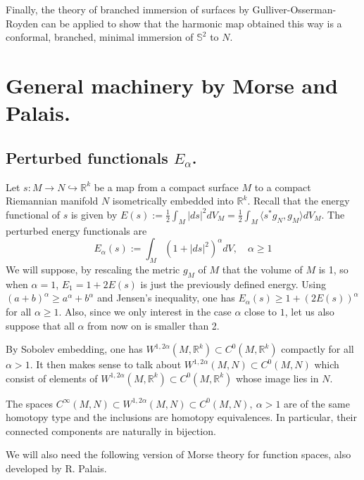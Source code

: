 Finally, the theory of branched immersion of surfaces by Gulliver-Osserman-Royden
\cite{gulliver_theory_1973} can be applied to show that the harmonic map obtained this way
is a conformal, branched, minimal immersion of \(\mathbb{S}^2\) to \(N\).

\section{General machinery by Morse and Palais.}
\label{sec:org803244d}

\subsection{Perturbed functionals \(E_\alpha\).}
\label{sec:orgd6188a2}

Let \(s: M \longrightarrow N \hookrightarrow \mathbb{R}^k\) be a map from a compact
surface \(M\) to a compact Riemannian manifold \(N\) isometrically embedded into \(\mathbb{R}^k\). Recall that the energy functional of \(s\) is given by \(E(s):=
\frac{1}{2}\int_M |ds|^2 dV_M = \frac{1}{2}\int_M \langle s^* g_N, g_M \rangle dV_M\). The perturbed energy functionals are
\[
 E_\alpha(s) := \int_M\left(1 + |ds|^2\right)^\alpha dV,\quad \alpha \geq 1
\]
We will suppose, by rescaling the metric \(g_M\) of \(M\) that the volume of \(M\)
is 1, so when \(\alpha=1\), \(E_1 =  1+ 2E(s)\) is just the previously defined energy. Using \((a+b)^\alpha \geq a^\alpha + b^\alpha\) and Jensen's inequality, one has \(E_\alpha(s) \geq 1 + (2E(s))^\alpha\) for all \(\alpha \geq 1\). Also, since we only
interest in the case \(\alpha\) close to \(1\), let us also suppose that all \(\alpha\) from now on is smaller than 2.

By Sobolev embedding, one has \(W^{1,2\alpha}(M, \mathbb{R}^k) \subset C^0(M,
\mathbb{R}^k)\) compactly for all \(\alpha >1\). It then makes sense to talk about \(W^{1,2\alpha}(M,N) \subset C^0(M,N)\) which consist of elements of \(W^{1,2\alpha}(M,
\mathbb{R}^k)\subset C^0(M, \mathbb{R}^k)\) whose image lies in \(N\).

\begin{theorem}[Palais]
\label{thm:Palais-1}
The spaces \(C^\infty (M,N)\subset W^{1,2\alpha}(M,N)\subset C^0(M,N), \ \alpha>1\) are
of the same homotopy type and the inclusions are homotopy equivalences. In particular,
their connected components are naturally in bijection.
\end{theorem}

We will also need the following version of Morse theory for function spaces, also
developed by R. Palais.

